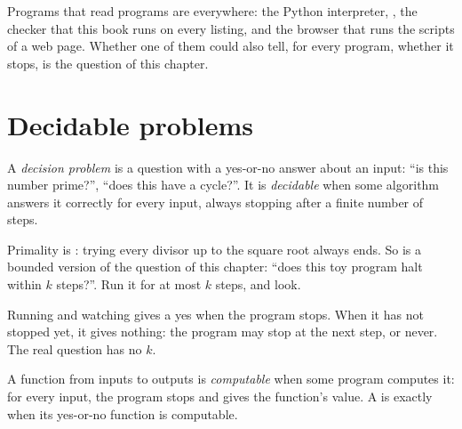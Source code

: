 Programs that read programs are everywhere: the Python interpreter, , the checker  that this book
runs on every listing, and the browser that runs the scripts of a web page. Whether one of them could also tell, for
every program, whether it stops, is the question of this chapter.

\section{Decidable problems}\label{sec:g12:halting-problem:decidable}

\begin{definition}\label{def:g12:halting-problem:decidable}
A \emph{decision problem} is a question with a yes-or-no answer about an input: ``is this
number prime?'', ``does this  have a cycle?''. It is \emph{decidable} when some
algorithm answers it correctly for every input, always stopping after a finite number of steps.
\end{definition}

Primality is : trying every divisor up to the square root always ends. So is a bounded version of the
question of this chapter: ``does this toy program halt within $k$ steps?''. Run it for at most $k$ steps, and look.

\label{lst:g12:halting-problem:within}

\label{lst:g12:halting-problem:programs}

\label{out:g12:halting-problem:within}

Running and watching gives a yes when the program stops. When it has not stopped yet, it gives nothing: the program
may stop at the next step, or never. The real question has no $k$.

\begin{definition}\label{def:g12:halting-problem:computable}
A function from inputs to outputs is \emph{computable} when some program computes it: for
every input, the program stops and gives the function's value. A  is  exactly when its
yes-or-no function is computable.
\end{definition}

